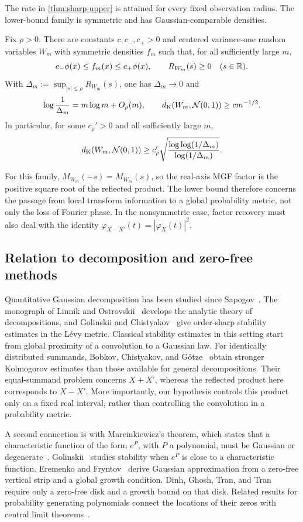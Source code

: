 The rate in \cref{thm:sharp-upper} is attained for every fixed observation radius. The lower-bound family is symmetric and has Gaussian-comparable densities.
\begin{theorem}\label{thm:sharpness}
Fix $\rho>0$. There are constants $c,c_-,c_+>0$ and centered variance-one random variables $W_m$ with symmetric densities $f_m$ such that, for all sufficiently large $m$,
\[
c_-\phi(x)\le f_m(x)\le c_+\phi(x),
\qquad R_{W_m}(s)\ge0\quad(s\in\mathbb R).
\]
With $\Delta_m:=\sup_{|s|\le\rho}R_{W_m}(s)$, one has $\Delta_m\to0$ and
\[
\log\frac1{\Delta_m}=m\log m+O_\rho(m),
\qquad
d_{\mathrm K}(W_m,\mathcal N(0,1))\ge c m^{-1/2}.
\]
In particular, for some $c_\rho'>0$ and all sufficiently large $m$,
\[
d_{\mathrm K}(W_m,\mathcal N(0,1))
\ge c_\rho'\sqrt{\frac{\log\log(1/\Delta_m)}{\log(1/\Delta_m)}}.
\]
\end{theorem}

For this family, $M_{W_m}(-s)=M_{W_m}(s)$, so the real-axis MGF factor is the positive square root of the reflected product. The lower bound therefore concerns the passage from local transform information to a global probability metric, not only the loss of Fourier phase. In the nonsymmetric case, factor recovery must also deal with the identity $\varphi_{X-X'}(t)=|\varphi_X(t)|^2$.

\subsection{Relation to decomposition and zero-free methods}

Quantitative Gaussian decomposition has been studied since Sapogov~\cite{Sapogov1951}. The monograph of Linnik and Ostrovskii~\cite{LinnikOstrovskii1977} develops the analytic theory of decompositions, and Golinskii and Chistyakov~\cite{GolinskiiChistyakov1994} give order-sharp stability estimates in the L\'evy metric. Classical stability estimates in this setting start from global proximity of a convolution to a Gaussian law. For identically distributed summands, Bobkov, Chistyakov, and G\"otze~\cite{BobkovChistyakovGotze2013} obtain stronger Kolmogorov estimates than those available for general decompositions. Their equal-summand problem concerns $X+X'$, whereas the reflected product here corresponds to $X-X'$. More importantly, our hypothesis controls this product only on a fixed real interval, rather than controlling the convolution in a probability metric.

A second connection is with Marcinkiewicz's theorem, which states that a characteristic function of the form $e^P$, with $P$ a polynomial, must be Gaussian or degenerate~\cite{Marcinkiewicz1939}. Golinskii~\cite{Golinskii1991} studies stability when $e^P$ is close to a characteristic function. Eremenko and Fryntov~\cite{EremenkoFryntov2021} derive Gaussian approximation from a zero-free vertical strip and a global growth condition. Dinh, Ghosh, Tran, and Tran~\cite[Theorem~2.2]{DinhGhoshTranTran2026} require only a zero-free disk and a growth bound on that disk. Related results for probability generating polynomials connect the locations of their zeros with central limit theorems~\cite{LebowitzPittelRuelleSpeer2016,MichelenSahasrabudhe2019,MichelenSahasrabudhe2026}.

